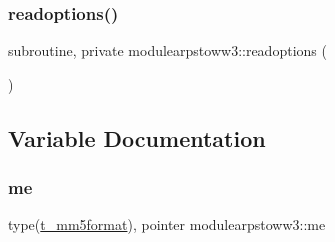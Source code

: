 \subsubsection{\texorpdfstring{readoptions()}{readoptions()}}
{\footnotesize\ttfamily subroutine, private modulearpstoww3\+::readoptions (\begin{DoxyParamCaption}{ }\end{DoxyParamCaption})\hspace{0.3cm}{\ttfamily [private]}}



\subsection{Variable Documentation}
\mbox{\label{namespacemodulearpstoww3_ae048aea87bb0343812cdb60ee1a1f6b8}} 
\subsubsection{\texorpdfstring{me}{me}}
{\footnotesize\ttfamily type(\mbox{\hyperlink{structmodulearpstoww3_1_1t__mm5format}{t\+\_\+mm5format}}), pointer modulearpstoww3\+::me\hspace{0.3cm}{\ttfamily [private]}}

